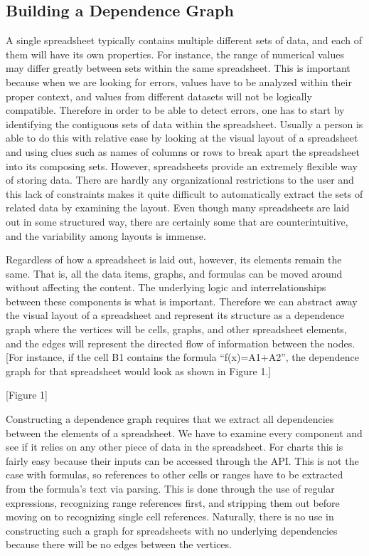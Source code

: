 \subsection{Building a Dependence Graph}

A single spreadsheet typically contains multiple different sets of
data, and each of them will have its own properties.  For instance,
the range of numerical values may differ greatly between sets within
the same spreadsheet.  This is important because when we are looking
for errors, values have to be analyzed within their proper context,
and values from different datasets will not be logically compatible.
Therefore in order to be able to detect errors, one has to start by
identifying the contiguous sets of data within the spreadsheet.
Usually a person is able to do this with relative ease by looking at
the visual layout of a spreadsheet and using clues such as names of
columns or rows to break apart the spreadsheet into its composing
sets.  However, spreadsheets provide an extremely flexible way of
storing data.  There are hardly any organizational restrictions to the
user and this lack of constraints makes it quite difficult to
automatically extract the sets of related data by examining the
layout.  Even though many spreadsheets are laid out in some structured
way, there are certainly some that are counterintuitive, and the
variability among layouts is immense.

Regardless of how a spreadsheet is laid out, however, its elements
remain the same.  That is, all the data items, graphs, and formulas
can be moved around without affecting the content.  The underlying
logic and interrelationships between these components is what is
important.  Therefore we can abstract away the visual layout of a
spreadsheet and represent its structure as a dependence graph where
the vertices will be cells, graphs, and other spreadsheet elements,
and the edges will represent the directed flow of information between
the nodes.  [For instance, if the cell B1 contains the formula
 ``f(x)=A1+A2'', the dependence graph for that spreadsheet would
  look as shown in Figure 1.]

[Figure 1]

Constructing a dependence graph requires that we extract all
dependencies between the elements of a spreadsheet.  We have to
examine every component and see if it relies on any other piece of
data in the spreadsheet.  For charts this is fairly easy because their
inputs can be accessed through the API.  This is not the case with
formulas, so references to other cells or ranges have to be extracted
from the formula's text via parsing.  This is done through the use
of regular expressions, recognizing range references first, and
stripping them out before moving on to recognizing single cell
references.  Naturally, there is no use in constructing such a graph
for spreadsheets with no underlying dependencies because there will be
no edges between the vertices.

